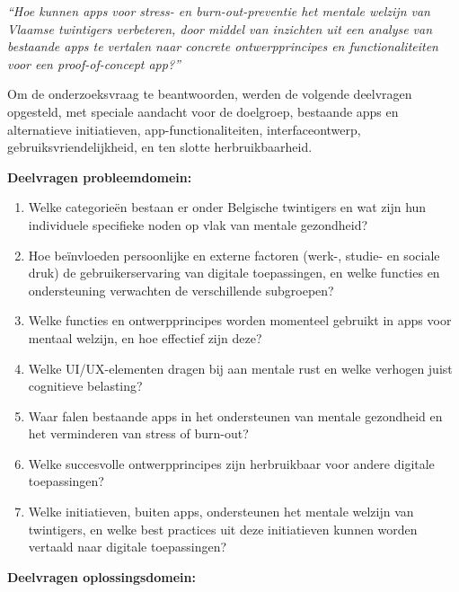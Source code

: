 \vspace{1em}

\textit{``Hoe kunnen apps voor stress- en burn-out-preventie het mentale welzijn van Vlaamse twintigers verbeteren, door middel van inzichten uit een analyse van bestaande apps te vertalen naar concrete ontwerpprincipes en functionaliteiten voor een proof-of-concept app?''}

\vspace{1em}

Om de onderzoeksvraag te beantwoorden, werden de volgende deelvragen opgesteld, met speciale aandacht voor de doelgroep, bestaande apps en alternatieve initiatieven, app-functionaliteiten, interfaceontwerp, gebruiksvriendelijkheid, en ten slotte herbruikbaarheid.

\vspace{1em}

\textbf{\newline Deelvragen probleemdomein:}

\begin{enumerate}
    \item Welke categorieën bestaan er onder Belgische twintigers en wat zijn hun individuele specifieke noden op vlak van mentale gezondheid?
    \item Hoe beïnvloeden persoonlijke en externe factoren (werk-, studie- en sociale druk) de gebruikerservaring van digitale toepassingen, en welke functies en ondersteuning verwachten de verschillende subgroepen? %
    
    \item Welke functies en ontwerpprincipes worden momenteel gebruikt in apps voor mentaal welzijn, en hoe effectief zijn deze?
    \item Welke UI/UX-elementen dragen bij aan mentale rust en welke verhogen juist cognitieve belasting?
    \item Waar falen bestaande apps in het ondersteunen van mentale gezondheid en het verminderen van stress of burn-out?
    \item Welke succesvolle ontwerpprincipes zijn herbruikbaar voor andere digitale toepassingen?
    
    \item Welke initiatieven, buiten apps, ondersteunen het mentale welzijn van twintigers, en welke best practices uit deze initiatieven kunnen worden vertaald naar digitale toepassingen?
\end{enumerate}

\textbf{\newline Deelvragen oplossingsdomein:}


